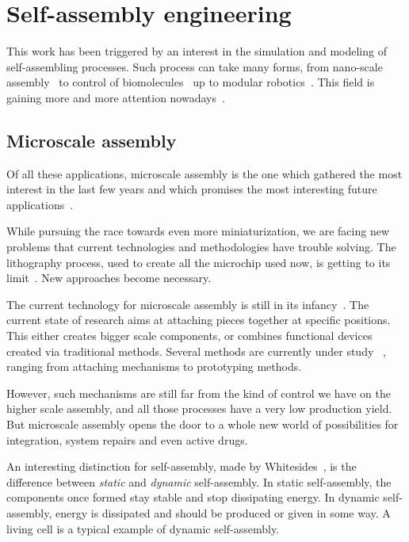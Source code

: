 \section{Self-assembly engineering} %
\label{sec:self_assembly_engineering}
	This work has been triggered by an interest in the simulation and modeling of self-assembling processes. Such process can take many forms, from nano-scale assembly~\cite{Grzybowski:2004p253, Griffith:2005p1681, Rechtsman:2006p182} to control of biomolecules~\cite{Forster:2006p4122,Dunbar:2007p3456,XiaorongXiong:2007p3539,Berger:1994p3997} up to modular robotics~\cite{Shen:2007p2613,Klavins:2007p2600}. This field is gaining more and more attention nowadays~\cite{Whitesides:2002p3757}.
	
	\subsection{Microscale assembly} %
	\label{sub:nano_assembly}
		Of all these applications, microscale assembly is the one which gathered the most interest in the last few years and which promises the most interesting future applications~\cite{Whitesides:2002p3757,Kassner:2005p197}.
		
		While pursuing the race towards even more miniaturization, we are facing new problems that current technologies and methodologies have trouble solving. The lithography process, used to create all the microchip used now, is getting to its limit~\cite{Whitesides:2002p3757}. New approaches become necessary.
	
		The current technology for microscale assembly is still in its infancy~\cite{Whitesides:2002p3757}. The current state of research aims at attaching pieces together at specific positions. This either creates bigger scale components, or combines functional devices created via traditional methods. Several methods are currently under study ~\cite{Onoe:2004p4478, Zheng:2005p4548, Stauth:2006p4594, Grzybowski:2004p253}, ranging from attaching mechanisms to prototyping methods.
		
		However, such mechanisms are still far from the kind of control we have on the higher scale assembly, and all those processes have a very low production yield. But microscale assembly opens the door to a whole new world of possibilities for integration, system repairs and even active drugs.
		
		An interesting distinction for self-assembly, made by Whitesides~\cite{Whitesides:2002p3757}, is the difference between \textit{static} and \textit{dynamic} self-assembly. In static self-assembly, the components once formed stay stable and stop dissipating energy. In dynamic self-assembly, energy is dissipated and should be produced or given in some way. A living cell is a typical example of dynamic self-assembly.
		
